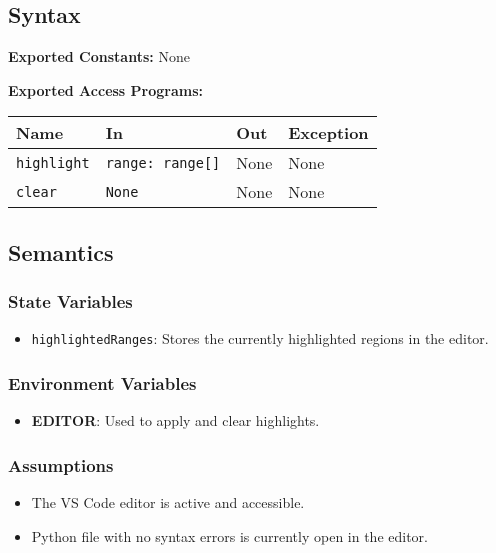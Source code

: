 \documentclass[12pt, titlepage]{article}
\begin{document}
\subsection{Syntax}

\textbf{Exported Constants:} None

\noindent \textbf{Exported Access Programs:}\\
\begin{tabularx}{\linewidth}{|l|>{\raggedright\arraybackslash}X|l|l|}
  \hline
  \textbf{Name} & \textbf{In} & \textbf{Out} & \textbf{Exception} \\
  \hline
  \texttt{highlight} & \texttt{range: range[]} & None & None \\ \hline
  \texttt{clear} & \texttt{None} & None & None \\
  \hline
\end{tabularx}

\subsection{Semantics}

\subsubsection{State Variables}
\begin{itemize}
\item \texttt{highlightedRanges}: Stores the currently highlighted regions in the editor.
\end{itemize}

\subsubsection{Environment Variables}
\begin{itemize}
\item \textbf{EDITOR}: Used to apply and clear highlights.
\end{itemize}

\subsubsection{Assumptions}
\begin{itemize}
\item The VS Code editor is active and accessible.
\item Python file with no syntax errors is currently open in the editor.
\end{itemize}
\end{document}
